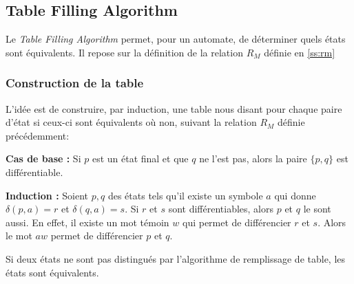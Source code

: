 \subsection{Table Filling Algorithm}\label{ss:tfa}

Le \emph{Table Filling Algorithm} permet, pour un automate, de déterminer quels états sont équivalents. Il repose sur la définition de la relation $R_M$ définie en \ref{ss:rm}

\subsubsection{Construction de la table}

L'idée est de construire, par induction, une table nous disant pour chaque paire d'état si ceux-ci sont équivalents où non, suivant la relation $R_M$ définie précédemment:

\textbf{Cas de base :} Si $p$ est un état final et que $q$ ne l'est pas, alors la paire $\{p,q\}$ est différentiable.

\textbf{Induction : } Soient $p,q$ des états tels qu'il existe un symbole $a$ qui donne $\delta(p,a)=r$ et $\delta(q,a)=s$. Si $r$ et $s$ sont différentiables, alors $p$ et $q$ le sont aussi. En effet, il existe un mot témoin $w$ qui permet de différencier $r$ et $s$. Alors le mot $aw$ permet de différencier $p$ et $q$.

\begin{theorem}
	Si deux états ne sont pas distingués par l'algorithme de remplissage de table, les états sont équivalents.
\end{theorem}


